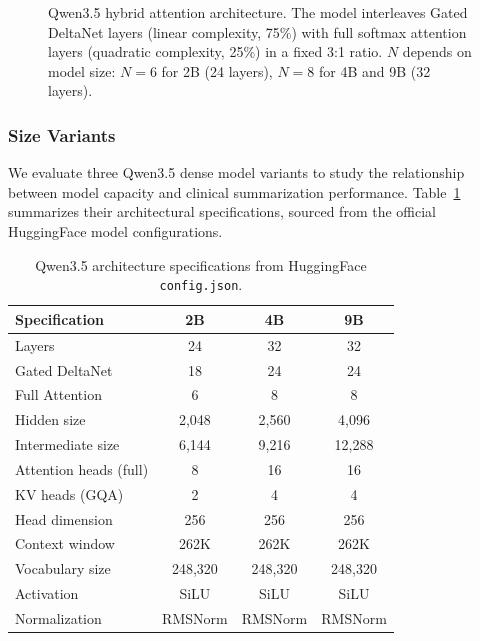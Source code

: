 \documentclass[12pt,a4paper,oneside]{report}
\begin{document}
\begin{figure}[htbp]
\caption{Qwen3.5 hybrid attention architecture. The model interleaves Gated DeltaNet layers (linear complexity, 75\%) with full softmax attention layers (quadratic complexity, 25\%) in a fixed 3:1 ratio. $N$ depends on model size: $N{=}6$ for 2B (24 layers), $N{=}8$ for 4B and 9B (32 layers).}
\label{fig:qwen35-arch}
\end{figure}

\subsubsection{Size Variants}

We evaluate three Qwen3.5 dense model variants to study the relationship between model capacity and clinical summarization performance. Table~\ref{tab:qwen35-specs} summarizes their architectural specifications, sourced from the official HuggingFace model configurations.

\begin{table}[htbp]
\centering
\caption{Qwen3.5 architecture specifications from HuggingFace \texttt{config.json}.}
\label{tab:qwen35-specs}
\begin{tabular}{lccc}
\toprule
\textbf{Specification} & \textbf{2B} & \textbf{4B} & \textbf{9B} \\
\midrule
Layers                    & 24    & 32    & 32    \\
\quad Gated DeltaNet      & 18    & 24    & 24    \\
\quad Full Attention       & 6     & 8     & 8     \\
Hidden size               & 2,048 & 2,560 & 4,096 \\
Intermediate size         & 6,144 & 9,216 & 12,288 \\
Attention heads (full)    & 8     & 16    & 16    \\
KV heads (GQA)            & 2     & 4     & 4     \\
Head dimension            & 256   & 256   & 256   \\
Context window            & 262K  & 262K  & 262K  \\
Vocabulary size           & 248,320 & 248,320 & 248,320 \\
Activation                & SiLU  & SiLU  & SiLU  \\
Normalization             & RMSNorm & RMSNorm & RMSNorm \\
\bottomrule
\end{tabular}
\end{table}
\end{document}
